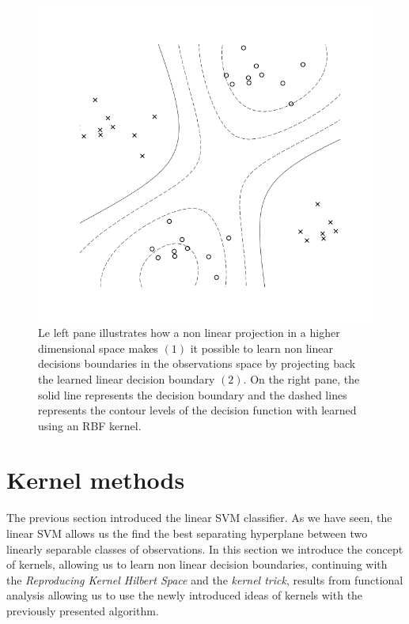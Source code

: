 \begin{figure}
  \begin{minipage}{.5\textwidth}
    \centering
    
  \end{minipage}%
  \begin{minipage}{.5\textwidth}
    \centering
    \includegraphics[width=\linewidth]{decision_boundary.png}
  \end{minipage}
  \caption{
    Le left pane illustrates how a non linear projection in a higher dimensional space makes $(1)$ it possible to learn non linear decisions boundaries in the observations space by projecting back the learned linear decision boundary $(2)$. On the right pane, the solid line represents the decision boundary and the dashed lines represents the contour levels of the decision function with learned using an RBF kernel.
  }
\end{figure}

\section{Kernel methods}

The previous section introduced the linear SVM classifier. As we have seen, the linear SVM  allows us the find the best separating hyperplane between two linearly separable classes of observations. In this section we introduce the concept of kernels, allowing us to learn non linear decision boundaries, continuing with the \textit{Reproducing Kernel Hilbert Space} and the \textit{kernel trick}, results from functional analysis allowing us to use the newly introduced ideas of kernels with the previously presented algorithm.

